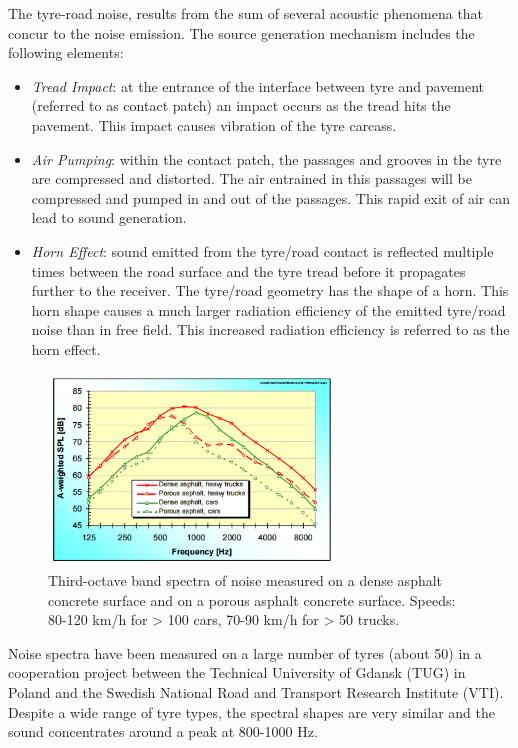 The tyre-road noise, results from the sum of several acoustic phenomena that concur to the noise emission. The source generation mechanism includes the following elements: 
\begin{itemize}
	\item  \textit{Tread Impact}: at the entrance of the interface between tyre and pavement (referred to as contact patch) an impact occurs as the tread hits the pavement. This impact causes vibration of the tyre carcass. 
	\item \textit{Air Pumping}: within the contact patch, the passages and grooves in the tyre are compressed and distorted. The air entrained in this passages will be compressed and pumped in and out of the passages. This  rapid exit of air can lead to sound generation.
	\item \textit{Horn Effect}: sound emitted from the tyre/road contact is reflected multiple times between the road surface and the tyre tread before it propagates further to the receiver. The tyre/road geometry has the shape of a horn. This horn shape causes a much larger radiation efficiency of the emitted tyre/road noise than in free field. This increased radiation efficiency is referred to as the horn effect. 
\end{itemize}	
\begin{figure}[h]
	\centering
	\includegraphics[width=0.68\textwidth]{img/spectra.png}
	\caption[Third-Octave Band Noise Spectra]{Third-octave band spectra of noise measured on a dense asphalt concrete surface and on a porous asphalt concrete surface. Speeds: 80-120 km/h for > 100
cars, 70-90 km/h for > 50 trucks.}
	\label{fig:noise-spec}
\end{figure} 
Noise spectra have been measured on a large number of tyres (about 50) \cite{sandberg2003multi} in a cooperation project between the Technical University of Gdansk (TUG) in Poland and the Swedish National Road and Transport Research Institute (VTI). Despite a wide range of tyre types, the spectral shapes are very similar and the sound concentrates around a peak at 800-1000 Hz. 
